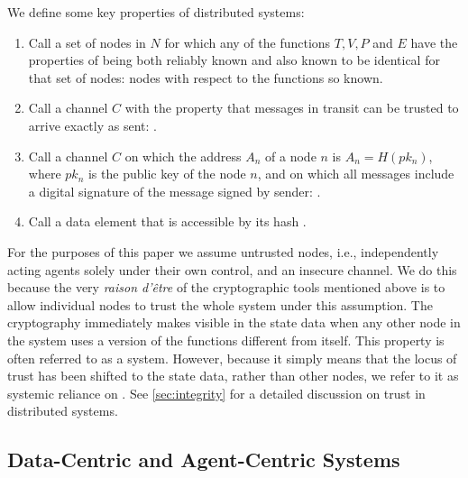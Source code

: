 \documentclass[twocolumn,showpacs,%
  nofootinbib,aps,superscriptaddress,%
  eqsecnum,prd,notitlepage,showkeys,10pt]{revtex4-1}
\begin{document}
We define some key properties of distributed systems:
\begin{enumerate}
\item Call a set of nodes in $N$ for which any of the functions $T,V,P$ and $E$ have the properties of being both reliably known and also known to be identical for that set of nodes:  nodes with respect to the functions so known.
\item Call a channel $C$ with the property that messages in transit can be trusted to arrive exactly as sent: .
\item Call a channel $C$ on which the address $A_n$ of a node $n$ is $A_n=H(pk_n)$, where $pk_n$ is the public key of the node $n$, and on which all messages include a digital signature of the message signed by sender: .

\item Call a data element that is accessible by its hash .
\end{enumerate}
For the purposes of this paper we assume untrusted nodes, i.e., independently acting agents solely under their own control, and an insecure channel.  We do this because the very \textit{raison d'\^etre} of the cryptographic tools mentioned above is to allow individual nodes to trust the whole system under this assumption.  The cryptography immediately makes visible in the state data when any other node in the system uses a version of the functions different from itself.  This property is often referred to as a  system.  However, because it simply means that the locus of trust has been shifted to the state data, rather than other nodes, we refer to it as systemic reliance on . See \ref{sec:integrity} for a detailed discussion on trust in distributed systems.

\subsection{Data-Centric and Agent-Centric Systems}
\label{sec:data-agent}
\end{document}
